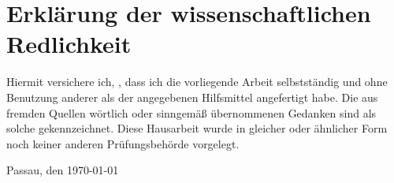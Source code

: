 \documentclass{Hausarbeit}
\begin{document}
\newpage
\section*{Erklärung der wissenschaftlichen Redlichkeit}

Hiermit versichere ich, \theauthor, dass ich die
vorliegende Arbeit selbstständig und ohne Benutzung anderer
als der angegebenen Hilfsmittel angefertigt habe. Die aus
fremden Quellen wörtlich oder sinngemäß übernommenen Gedanken
sind als solche gekennzeichnet. Diese Hausarbeit wurde
in gleicher oder ähnlicher Form noch keiner anderen
Prüfungsbehörde vorgelegt.

\vspace*{1cm}

Passau, den \today\\[0.5cm]
\hspace{0.5cm} \makebox[4cm]{\hrulefill}\\
\theauthor
\end{document}
